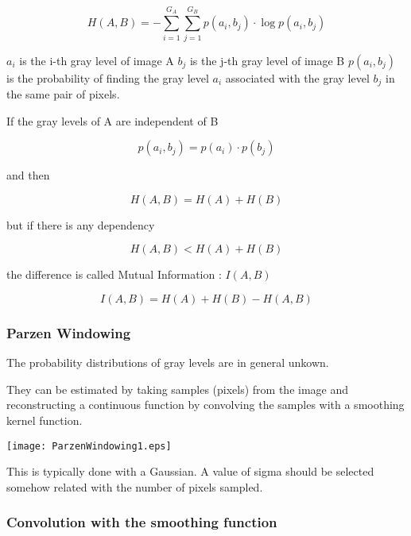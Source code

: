 \begin{equation}
H(A,B)=-\sum _{i=1}^{G_{A}}\sum _{j=1}^{G_{B}}p\left( a_{i},b_{j}\right) \cdot \log p\left( a_{i},b_{j}\right)
\end{equation}


\begin{center}
$a_{i}$ is the i-th gray level of image A
$b_{j}$ is the j-th gray level of image B $p\left( a_{i},b_{j}\right)$ is the
probability of finding the gray level $a_{i}$ associated with the gray level
$b_{j}$ in the same pair of pixels.
\end{center}


If the gray levels of A are independent of B

\begin{equation}
p\left( a_{i},b_{j}\right) =p\left( a_{i}\right) \cdot p\left( b_{j}\right) 
\end{equation}


and then 

\begin{equation}
H(A,B)=H(A)+H(B)
\end{equation}


but if there is any dependency

\begin{equation}
H(A,B)<H(A)+H(B)
\end{equation}


the difference is called Mutual Information : \( I(A,B) \)

\begin{equation}
I(A,B)=H(A)+H(B)-H(A,B)
\end{equation}



\subsubsection{Parzen Windowing}

The probability distributions of gray levels are in general unkown.

They can be estimated by taking samples (pixels) from the image and
reconstructing a continuous function by convolving the samples with a smoothing
kernel function.

\texttt{[image: ParzenWindowing1.eps]}

This is typically done with a Gaussian. A value of sigma should be selected
somehow related with the number of pixels sampled.  

\subsubsection{Convolution with the
smoothing function}

